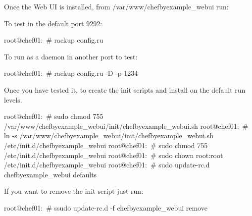 Once the Web UI is installed, from /var/www/chefbyexample\_webui run:

To test in the default port 9292:
\begin{codelisting}
\label{code:}
\codecaption{}
\begin{code}
root@chef01:~# rackup config.ru
\end{code}
\end{codelisting}

To run as a daemon in another port to test:

\begin{codelisting}
\label{code:}
\codecaption{}
\begin{code}
root@chef01:~# rackup config.ru -D -p 1234
\end{code}
\end{codelisting}

Once you have tested it, to create the init scripts and install on the default run levels.

\begin{codelisting}
\label{code:}
\codecaption{}
\begin{code}
root@chef01:~# sudo chmod 755 /var/www/chefbyexample_webui/init/chefbyexample_webui.sh
root@chef01:~# ln -s /var/www/chefbyexample_webui/init/chefbyexample_webui.sh /etc/init.d/chefbyexample_webui
root@chef01:~# sudo chmod 755 /etc/init.d/chefbyexample_webui
root@chef01:~# sudo chown root:root /etc/init.d/chefbyexample_webui
root@chef01:~# sudo update-rc.d chefbyexample_webui defaults
\end{code}
\end{codelisting}

If you want to remove the init script just run:

\begin{codelisting}
\label{code:}
\codecaption{}
\begin{code}
root@chef01:~# ssudo update-rc.d -f chefbyexample_webui remove
\end{code}
\end{codelisting}